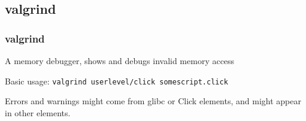 \documentclass{beamer}
\begin{document}
\subsection{valgrind} %
\label{sub:valgrind}

\begin{frame}
\frametitle{valgrind}
A memory debugger, shows and debugs invalid memory access

Basic usage: \lstinline!valgrind userlevel/click somescript.click!

Errors and warnings might come from glibc or Click elements, and might appear in other elements.
\end{frame}
\end{document}
